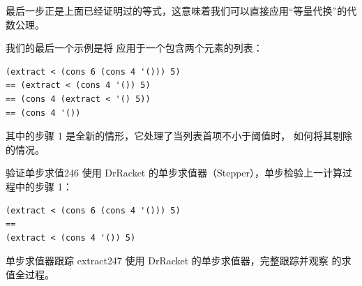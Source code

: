 最后一步正是上面已经证明过的等式，这意味着我们可以直接应用“等量代换”的代数公理。

我们的最后一个示例是将  应用于一个包含两个元素的列表：

\begin{stepperbox}
\begin{Verbatim}[commandchars=\\\{\}, fontsize=\footnotesize]
(extract < (cons 6 (cons 4 '())) 5)
== (extract < (cons 4 '()) 5)
== (cons 4 (extract < '() 5))
== (cons 4 '())
\end{Verbatim}
\end{stepperbox}

其中的步骤 1 是全新的情形，它处理了当列表首项不小于阈值时， 如何将其剔除的情况。

\begin{exercise}{验证单步求值}{246}
使用 DrRacket 的单步求值器（Stepper），单步检验上一计算过程中的步骤 1：

\begin{stepperbox}
\begin{Verbatim}[commandchars=\\\{\}, fontsize=\scriptsize]
(extract < (cons 6 (cons 4 '())) 5)
==
(extract < (cons 4 '()) 5)
\end{Verbatim}
\end{stepperbox}
\end{exercise}

\begin{exercise}{单步求值器跟踪 extract}{247}
使用 DrRacket 的单步求值器，完整跟踪并观察  的求值全过程。
\end{exercise}

